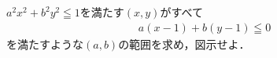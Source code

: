 \documentclass[../../main.tex]{subfiles}
\begin{document}
$a^2x^2+b^2y^2 \leqq 1$を満たす$(x,y)$がすべて
\begin{align}
  a(x-1)+b(y-1) \leqq 0
\end{align}
を満たすような$(a,b)$の範囲を求め，図示せよ．
\end{document}

